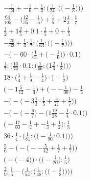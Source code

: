 \documentclass[8pt]{article}
\begin{document}
\begin{align}
-\frac{1}{24} + -\frac{1}{6} + \frac{1}{3} : \bigg(\frac{1}{24} : \Big(\big(-\frac{1}{3}\big)\Big)\bigg) \\
\frac{64}{105} - \big(\frac{12}{35} - \frac{1}{5}\big) + \frac{1}{5} + 2\frac{1}{3} \cdot \frac{1}{7} \\
\frac{1}{2} + 1\frac{2}{5} + 0.1 \cdot \frac{1}{5} + 0 + \frac{1}{5} \\
-\frac{20}{63} + \frac{1}{3} : \frac{1}{7} : \bigg(\frac{1}{63} : \Big(\big(-\frac{1}{7}\big)\Big)\bigg) \\
-\bigg(-60 \cdot \Big(\frac{1}{3} + \big(-\frac{1}{6}\big)\Big) \cdot 0.1\bigg) \\
\frac{1}{7} : \bigg(\frac{10}{70} \cdot 0.1 : \Big(\frac{1}{60} : \big(1\frac{2}{6} \cdot \frac{1}{8}\big)\Big)\bigg) \\
18 \cdot \big(\frac{1}{4} + \frac{1}{9} - \frac{1}{4}\big) \cdot \big(-\frac{1}{2}\big) \\
\big(-1\frac{5}{12} - \frac{1}{4}\big) + \big(--\frac{1}{30}\big) - \frac{1}{5} \\
-\Big(-\big(-3\frac{1}{3} \cdot \frac{1}{5} + \frac{4}{21} + \frac{1}{7}\big)\Big) \\
-\Big(-\big(-\frac{6}{7}\big) - \big(1\frac{19}{28} - \frac{1}{4} \cdot 0.1\big)\Big) \\
\big(-\frac{17}{60} - \frac{1}{4} + -\frac{1}{3} + \frac{1}{2}\big) : \frac{1}{5} \\
36 \cdot \frac{1}{4} \cdot \bigg(\frac{1}{81} : \Big(\big(-\frac{1}{90} : 0.1\big)\Big)\bigg) \\
\frac{5}{6} - \Big(-\big(--\frac{5}{42} + \frac{1}{7} + \frac{1}{7}\big)\Big) \\
\Big(-\big(-4\big)\Big) \cdot \Big(\big(-\frac{1}{20}\big) : \frac{1}{5}\Big) \\
\frac{2}{9} : \frac{1}{5} - \Bigg(\frac{1}{54} : \bigg(\frac{1}{48} : \Big(\big(-\frac{1}{8}\big)\Big)\bigg)\Bigg)
\end{align}
\end{document}
